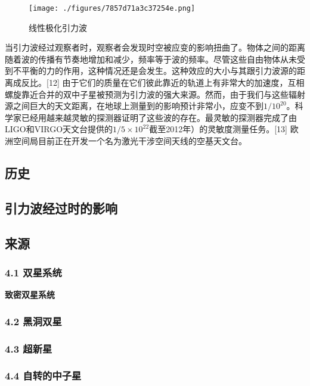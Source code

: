 \begin{figure}[ht]
\centering
\texttt{[image: ./figures/7857d71a3c37254e.png]}
\caption{线性极化引力波} \label{fig_YLB_2}
\end{figure}

当引力波经过观察者时，观察者会发现时空被应变的影响扭曲了。物体之间的距离随着波的传播有节奏地增加和减少，频率等于波的频率。尽管这些自由物体从未受到不平衡的力的作用，这种情况还是会发生。这种效应的大小与其跟引力波源的距离成反比。[12] 由于它们的质量在它们彼此靠近的轨道上有非常大的加速度，互相螺旋靠近合并的双中子星被预测为引力波的强大来源。然而，由于我们与这些辐射源之间巨大的天文距离，在地球上测量到的影响预计非常小，应变不到$1/10^{20}$。科学家已经用越来越灵敏的探测器证明了这些波的存在。最灵敏的探测器完成了由LIGO和VIRGO天文台提供的$1/{5 \times 10^{22}}$截至2012年）的灵敏度测量任务。[13] 欧洲空间局目前正在开发一个名为激光干涉空间天线的空基天文台。


\subsection{历史}

\subsection{引力波经过时的影响}

\subsection{来源}

\subsubsection{4.1 双星系统}

\textbf{致密双星系统}

\subsubsection{4.2 黑洞双星}

\subsubsection{4.3 超新星}

\subsubsection{4.4 自转的中子星}

